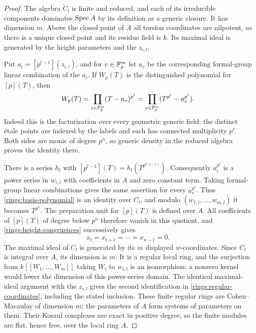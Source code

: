 \begin{proof}
The algebra $\widetilde C_l$ is finite and reduced, and each of its
irreducible components dominates $\operatorname{Spec} A$ by its definition as a
generic closure.  It has dimension $m$.  Above the closed point of
$A$ all torsion coordinates are nilpotent, so there is a unique
closed point and its residue field is $k$.  Its maximal ideal is
generated by the height parameters and the $z_{i,l}$.

Put $a_i=[p^{l-1}](z_{i,l})$, and for $v\in\mathbb F_p^m$ let $a_v$ be
the corresponding formal-group linear combination of the $a_i$.
If $W_p(T)$ is the distinguished polynomial for $[p](T)$, then
\begin{equation}\label{rings:basis-polynomial}
 W_p(T)=\prod_{v\in\mathbb F_p^m}(T-a_v)^{p^t}
       =\prod_{v\in\mathbb F_p^m}(T^{p^t}-a_v^{p^t}).
\end{equation}
Indeed this is the factorization over every geometric generic
field: the distinct \'etale points are indexed by the labels and
each has connected multiplicity $p^t$.  Both sides are monic of
degree $p^n$, so generic density in the reduced algebra proves the
identity there.

There is a series $h_l$ with
$[p^{l-1}](T)=h_l(T^{p^{t(l-1)}})$.  Consequently
$a_i^{p^t}$ is a power series in $w_{i,l}$ with coefficients in
$A$ and zero constant term.  Taking formal-group linear
combinations gives the same assertion for every $a_v^{p^t}$.
Thus \eqref{rings:basis-polynomial} is an identity over $C_l$,
and modulo $(w_{1,l},\ldots,w_{m,l})$ it becomes $T^{p^n}$.
The preparation unit for $[p](T)$ is defined over $A$.  All
coefficients of $[p](T)$ of degree below $p^n$ therefore vanish in this
quotient, and \eqref{rings:height-congruences} successively gives
\[
 x_t=x_{t+1}=\cdots=x_{n-1}=0.
\]
The maximal ideal of $C_l$ is generated by its $m$ displayed
$w$-coordinates.  Since $C_l$ is integral over $A$, its dimension
is $m$.  It is a regular local ring, and the surjection from
$k[[W_1,\ldots,W_m]]$ taking $W_i$ to $w_{i,l}$ is an
isomorphism: a nonzero kernel would lower the dimension of this
power-series domain.  The identical maximal-ideal argument with
the $z_{i,l}$ gives the second identification in
\eqref{rings:regular-coordinates}, including the stated
inclusion.  These finite regular rings are Cohen--Macaulay of
dimension $m$; the parameters of $A$ form systems of parameters
on them.  Their Koszul complexes are exact in positive degree,
so the finite modules are flat, hence free, over the local ring
$A$.


\end{proof}

